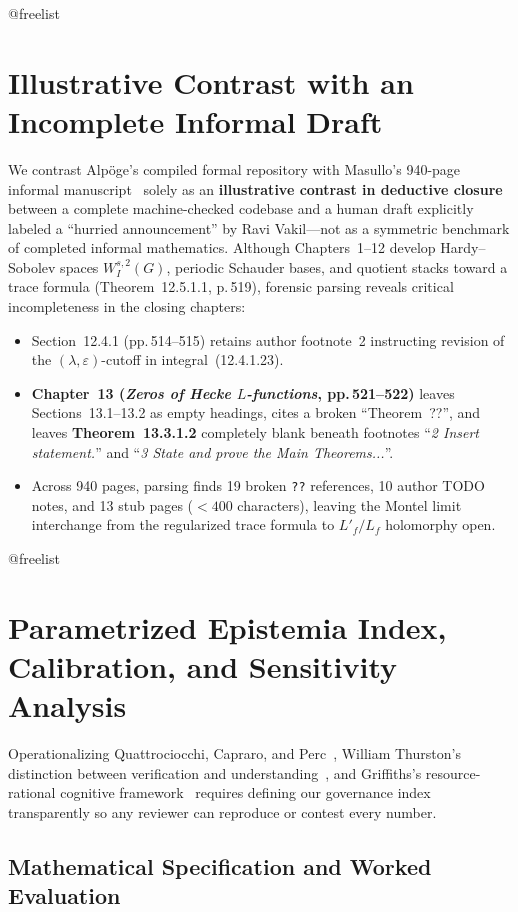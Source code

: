 \documentclass[11pt,a4paper]{article}
\makeatletter
\providecommand{\FloatBarrier}{%
  \par
  \expandafter\ifx\csname @freelist\endcsname\relax\else
    \ifx\@deferlist\@empty\else
      \clearpage
    \fi
  \fi
}
\let\orig@section\section
\renewcommand{\section}{\FloatBarrier\orig@section}
\makeatother
\begin{document}
\section{Illustrative Contrast with an Incomplete Informal Draft}

We contrast Alp{\"o}ge's compiled formal repository with Masullo's 940-page informal manuscript~\cite{vakil2026} solely as an \textbf{illustrative contrast in deductive closure} between a complete machine-checked codebase and a human draft explicitly labeled a ``hurried announcement'' by Ravi Vakil---not as a symmetric benchmark of completed informal mathematics. Although Chapters~1--12 develop Hardy--Sobolev spaces $W_I^{s,2}(G)$, periodic Schauder bases, and quotient stacks toward a trace formula (Theorem~12.5.1.1, p.\,519), forensic parsing reveals critical incompleteness in the closing chapters:
\begin{itemize}
  \item Section~12.4.1 (pp.\,514--515) retains author footnote~2 instructing revision of the $(\lambda,\varepsilon)$-cutoff in integral~(12.4.1.23).
  \item \textbf{Chapter~13 (\emph{Zeros of Hecke $L$-functions}, pp.\,521--522)} leaves Sections~13.1--13.2 as empty headings, cites a broken ``Theorem~??'', and leaves \textbf{Theorem~13.3.1.2} completely blank beneath footnotes ``\emph{2 Insert statement.}'' and ``\emph{3 State and prove the Main Theorems...}''.
  \item Across 940 pages, parsing finds 19 broken \texttt{??} references, 10 author TODO notes, and 13 stub pages ($<400$ characters), leaving the Montel limit interchange from the regularized trace formula to $L'_f/L_f$ holomorphy open.
\end{itemize}

\section{Parametrized Epistemia Index, Calibration, and Sensitivity Analysis}

Operationalizing Quattrociocchi, Capraro, and Perc~\cite{quattrociocchi2025}, William Thurston's distinction between verification and understanding~\cite{thurston1994}, and Griffiths's resource-rational cognitive framework~\cite{griffiths2026} requires defining our governance index transparently so any reviewer can reproduce or contest every number.

\subsection{Mathematical Specification and Worked Evaluation}
\end{document}
